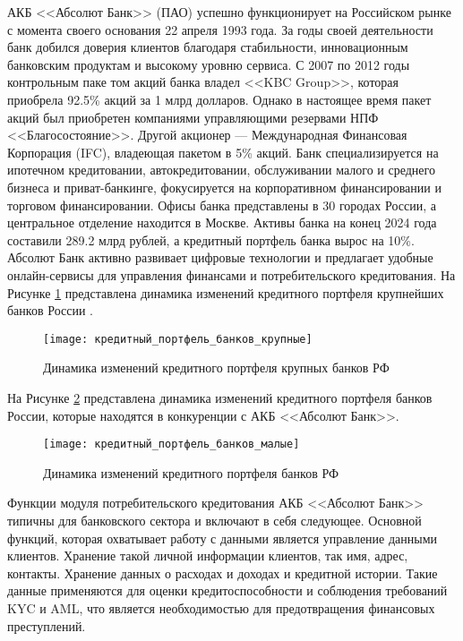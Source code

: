 \documentclass[14pt, a4paper]{extarticle}
\begin{document}
АКБ <<Абсолют Банк>> (ПАО) успешно функционирует на Российском рынке с момента
своего основания 22 апреля 1993 года. За годы своей деятельности банк добился
доверия клиентов благодаря стабильности, инновационным банковским продуктам и
высокому уровню сервиса. С 2007 по 2012 годы контрольным паке том акций банка
владел <<KBC Group>>, которая приобрела 92.5\% акций за 1 млрд долларов. Однако
в настоящее время пакет акций был приобретен компаниями управляющими резервами
НПФ <<Благосостояние>>. Другой акционер — Международная Финансовая Корпорация
(IFC), владеющая пакетом в 5\% акций. Банк специализируется на ипотечном
кредитовании, автокредитовании, обслуживании малого и среднего бизнеса и
приват-банкинге, фокусируется на корпоративном финансировании и торговом
финансировании. Офисы банка представлены в 30 городах России, а центральное
отделение находится в Москве. Активы банка на конец 2024 года составили 289.2
млрд рублей, а кредитный портфель банка вырос на 10\%. Абсолют Банк активно
развивает цифровые технологии и предлагает удобные онлайн-сервисы для
управления финансами и потребительского кредитования. На Рисунке
\ref{fig:кредитный_портфель_банков_крупные} представлена динамика
изменений кредитного портфеля крупнейших банков России \cite{banks-rating}.

\begin{figure}[H]
	\centering
	\texttt{[image: кредитный\_портфель\_банков\_крупные]}
	\caption{Динамика изменений кредитного портфеля крупных банков РФ}
	\label{fig:кредитный_портфель_банков_крупные}
\end{figure}

На Рисунке \ref{fig:кредитный_портфель_банков_малые} представлена динамика
изменений кредитного портфеля банков России, которые находятся в конкуренции с
АКБ <<Абсолют Банк>>.

\begin{figure}[H]
	\centering
	\texttt{[image: кредитный\_портфель\_банков\_малые]}
	\caption{Динамика изменений кредитного портфеля банков РФ}
	\label{fig:кредитный_портфель_банков_малые}
\end{figure}

Функции модуля потребительского кредитования АКБ <<Абсолют Банк>> типичны для
банковского сектора и включают в себя следующее. Основной функций, которая
охватывает работу с данными является управление данными клиентов. Хранение
такой личной информации клиентов, так имя, адрес, контакты. Хранение данных о
расходах и доходах и кредитной истории. Такие данные применяются для оценки
кредитоспособности и соблюдения требований KYC и AML, что является
необходимостью для предотвращения финансовых преступлений.
\end{document}
